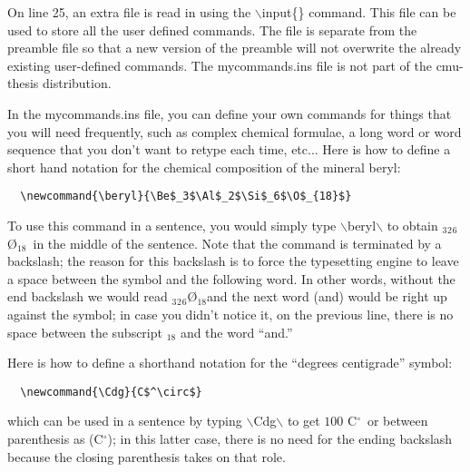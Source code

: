 \documentclass[DIV=calc, paper=letter, fontsize=11pt]{scrartcl}	 %
\newcommand{\la}[2]{\textsf{$\backslash$#1}\{#2\}}
\newcommand{\lb}[1]{\textsf{$\backslash$#1}}
\newcommand{\Cdg}{C$^\circ$}
\newcommand{\beryl}{\Be$_3$\Al$_2$\Si$_6$\O$_{18}$}
\begin{document}
On line 25, an extra file is read in using the \la{input}{} command. This file can be used to 
store all the user defined commands.  The file is separate from the preamble file so that a new
version of the preamble will not overwrite the already existing user-defined commands. The
\textsf{mycommands.ins} file is not part of the \textsf{cmu-thesis} distribution.

In the \textsf{mycommands.ins} file, you can define your own commands for things that you will
need frequently, such as complex chemical formulae, a long word or word sequence that
you don't want to retype each time, etc...  Here is how to define a short hand notation
for the chemical composition of the mineral beryl:
\begin{verbatim}
  \newcommand{\beryl}{\Be$_3$\Al$_2$\Si$_6$\O$_{18}$}
\end{verbatim}
To use this command in a sentence, you would simply type \lb{beryl}$\backslash$ to obtain \beryl\ in 
the middle of the sentence. Note that the command is terminated by a backslash; the reason for this 
backslash is to force the typesetting engine to leave a space between the symbol and 
the following word.  In other words, without the end backslash we would read \beryl and the next word
(and) would be right up against the symbol; in case you didn't notice it, on the previous line, there is no space
between the subscript $_{18}$ and the word ``and.'' 

Here is how to define a shorthand notation for the ``degrees centigrade'' symbol:
\begin{verbatim}
  \newcommand{\Cdg}{C$^\circ$}
\end{verbatim}
which can be used in a sentence by typing \lb{Cdg}$\backslash$ to get $100$ \Cdg\ or between parenthesis 
as (\Cdg); in this latter case, there is no need for the ending backslash because the closing parenthesis takes on that role.
\end{document}
